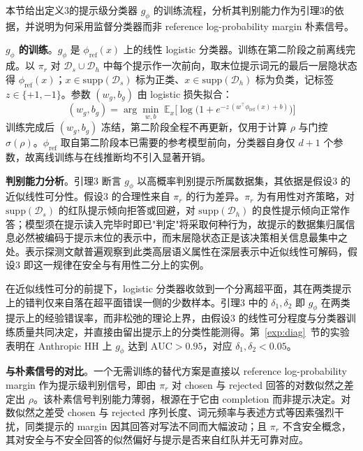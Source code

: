 \documentclass[lettersize,journal]{IEEEtran}
\begin{document}
本节给出定义3的提示级分类器 $g_\phi$ 的训练流程，分析其判别能力作为引理3的依据，并说明为何采用监督分类器而非 reference log-probability margin 朴素信号。

\textbf{$g_\phi$ 的训练}。$g_\phi$ 是 $\phi_{\text{ref}}(x)$ 上的线性 logistic 分类器。训练在第二阶段之前离线完成。以 $\pi_r$ 对 $\mathcal{D}_s \cup \mathcal{D}_h$ 中每个提示作一次前向，取末位提示词元的最后一层隐状态得 $\phi_{\text{ref}}(x)$；$x \in \mathrm{supp}(\mathcal{D}_s)$ 标为正类、$x \in \mathrm{supp}(\mathcal{D}_h)$ 标为负类，记标签 $z \in \{+1, -1\}$。参数 $(w_g, b_g)$ 由 logistic 损失拟合：
\begin{equation}
(w_g, b_g) = \arg\min_{w, b}\;
\mathbb{E}_{x}\big[\log\bigl(1 + e^{-z\,(w^\top \phi_{\text{ref}}(x) + b)}\bigr)\big]
\end{equation}
训练完成后 $(w_g, b_g)$ 冻结，第二阶段全程不再更新，仅用于计算 $\rho$ 与门控 $\sigma(\rho)$。$\phi_{\text{ref}}$ 取自第二阶段本已需要的参考模型前向，分类器自身仅 $d+1$ 个参数，故离线训练与在线推断均不引入显著开销。

\textbf{判别能力分析}。引理3 断言 $g_\phi$ 以高概率判别提示所属数据集，其依据是假设3 的近似线性可分性。假设3 的合理性来自 $\pi_r$ 的行为差异。$\pi_r$ 为有用性对齐策略，对 $\mathrm{supp}(\mathcal{D}_s)$ 的红队提示倾向拒答或回避，对 $\mathrm{supp}(\mathcal{D}_h)$ 的良性提示倾向正常作答；模型须在提示读入完毕时即已"判定"将采取何种行为，故提示的数据集归属信息必然被编码于提示末位的表示中，而末层隐状态正是该决策相关信息最集中之处。表示探测文献普遍观察到此类高层语义属性在深层表示中近似线性可解码\cite{alain2017understanding}，假设3 即这一规律在安全与有用性二分上的实例。

在近似线性可分的前提下，logistic 分类器收敛到一个分离超平面，其在两类提示上的错判仅来自落在超平面错误一侧的少数样本。引理3 中的 $\delta_1, \delta_2$ 即 $g_\phi$ 在两类提示上的经验错误率，而非松弛的理论上界，由假设3 的线性可分程度与分类器训练质量共同决定，并直接由留出提示上的分类性能测得。第~\ref{exp:diag}~节的实验表明在 Anthropic HH 上 $g_\phi$ 达到 $\text{AUC} > 0.95$，对应 $\delta_1, \delta_2 < 0.05$。

\textbf{与朴素信号的对比}。一个无需训练的替代方案是直接以 reference log-probability margin 作为提示级判别信号，即由 $\pi_r$ 对 chosen 与 rejected 回答的对数似然之差定出 $\rho$。该朴素信号判别能力薄弱，根源在于它由 completion 而非提示决定。对数似然之差受 chosen 与 rejected 序列长度、词元频率与表述方式等因素强烈干扰，同类提示的 margin 因其回答对写法不同而大幅波动；且 $\pi_r$ 不含安全概念，其对安全与不安全回答的似然偏好与提示是否来自红队并无可靠对应。
\end{document}
